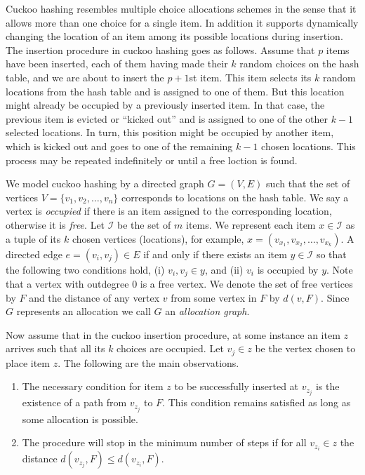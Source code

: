 Cuckoo hashing resembles multiple choice allocations schemes in the sense that it allows more than one choice for a single item. In addition it supports dynamically changing the location of an item among its possible locations during insertion. The insertion procedure in cuckoo hashing goes as follows. Assume that $p$ items have been inserted, each of them having made their $k$ random choices on the hash table, and we are about to insert the $p+1$st item. This item selects its $k$ random locations from the hash table and is assigned to one of them. But this location might already be occupied by a previously inserted item. In that case, the previous item is evicted or ``kicked out'' and is assigned to one of the other $k-1$ selected locations. In turn, this position might be occupied by another item, which is kicked out and goes to one of the remaining $k-1$ chosen locations. This process may be repeated indefinitely or until a free loction is found. 

We model cuckoo hashing by a directed graph $G=(V,E)$  such that the set of vertices $V=\{v_1,v_2,\ldots,v_n\}$ corresponds to locations on the hash table. We say a vertex is \emph{occupied} if there is an item assigned to the corresponding location, otherwise it is \emph{free}. Let $\mathcal{I}$ be the set of $m$ items. We represent each item $x\in\mathcal{I} $ as a tuple of its $k$ chosen vertices (locations), for example, $x=(v_{x_1},v_{x_2},\ldots , v_{x_k})$.
A directed edge $e=(v_i,v_j) \in E$ if and only if there exists an item $y\in \mathcal{I} $ so that the following two conditions hold, (i) $v_i,v_j \in y$, and (ii) $v_i$ is occupied by $y$. Note that a vertex with outdegree $0$ is a free vertex. We denote the set of free vertices by $F$ and the distance of any vertex $v$ from some vertex in $F$ by $d(v,F)$. Since $G$ represents an allocation we call $G$ an \emph{allocation graph}. 


Now assume that in the cuckoo insertion procedure, at some instance an item $z$ arrives such that all its $k$ choices are occupied. Let $v_j\in z$ be the vertex chosen to place item $z$. The following are the main observations.

 \begin{enumerate}
\item The necessary condition for item $z$ to be successfully inserted at $v_{z_j}$ is the existence of a path from $v_{z_j}$ to $F$. This condition remains satisfied as long as some allocation is possible.
\item The procedure will stop in the minimum number of steps if for all $v_{z_i}\in z$  the distance $d(v_{z_j},F)\le d(v_{z_i},F)$. \end{enumerate}


